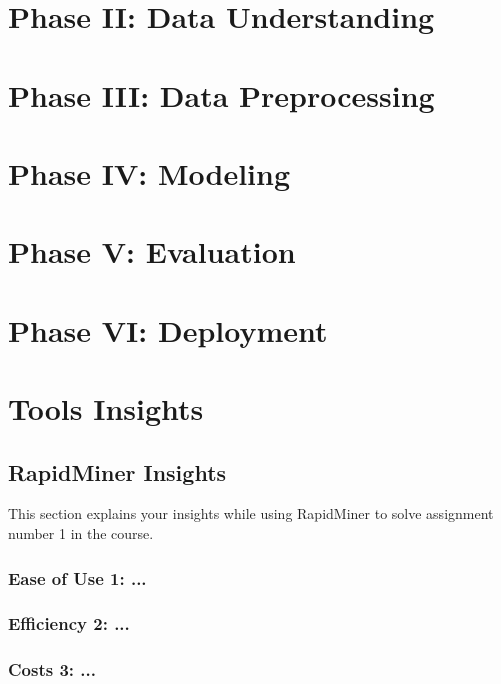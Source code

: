 \documentclass[12p,a4paper]{report}
\begin{document}
\chapter{Phase II: Data Understanding}


\chapter{Phase III: Data Preprocessing}


\chapter{Phase IV: Modeling}


\chapter{Phase V: Evaluation}


\chapter{Phase VI: Deployment}


\chapter{Tools Insights}


\section{RapidMiner Insights}
This section explains your insights while using RapidMiner to solve assignment number 1 in the course. 

\subsection{Ease of Use 1: ...}
    
\subsection{Efficiency 2: ...}
    
\subsection{Costs 3: ...}
\end{document}
